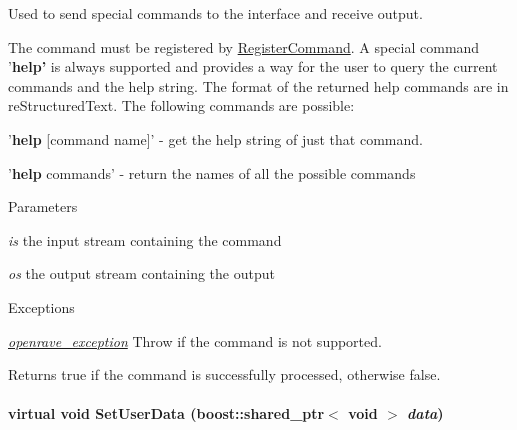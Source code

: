 Used to send special commands to the interface and receive output. 

The command must be registered by \hyperlink{classOpenRAVE_1_1InterfaceBase_a840776899a1d3677582fc6ef87be6ef2}{RegisterCommand}. A special command '{\bfseries help'} is always supported and provides a way for the user to query the current commands and the help string. The format of the returned help commands are in reStructuredText. The following commands are possible:
\begin{DoxyItemize}
\item '{\bfseries help} \mbox{[}command name\mbox{]}' -\/ get the help string of just that command.
\item '{\bfseries help} commands' -\/ return the names of all the possible commands
\end{DoxyItemize}


\begin{DoxyParams}{Parameters}
\item[{\em is}]the input stream containing the command \item[{\em os}]the output stream containing the output \end{DoxyParams}

\begin{DoxyExceptions}{Exceptions}
\item[{\em \hyperlink{classOpenRAVE_1_1openrave__exception}{openrave\_\-exception}}]Throw if the command is not supported. \end{DoxyExceptions}
\begin{DoxyReturn}{Returns}
true if the command is successfully processed, otherwise false. 
\end{DoxyReturn}
\hypertarget{classOpenRAVE_1_1InterfaceBase_aba2de87983f5e6ad881df19cc6198018}{
\paragraph[{SetUserData}]{\setlength{\rightskip}{0pt plus 5cm}virtual void SetUserData (boost::shared\_\-ptr$<$ void $>$ {\em data})}\hfill}
\label{classOpenRAVE_1_1InterfaceBase_aba2de87983f5e6ad881df19cc6198018}
